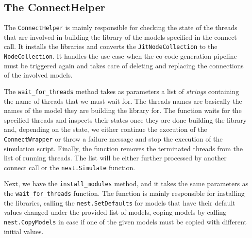 \subsection{The ConnectHelper}


The \texttt{ConnectHelper} is mainly responsible for checking the state of the threads that are involved in building the library of the models specified in the connect call. It installs the libraries and converts the \texttt{JitNodeCollection} to the \texttt{NodeCollection}. It handles the use case when the co-code generation pipeline must be triggered again and takes care of deleting and replacing the connections of the involved models.


The \texttt{wait\_for\_threads} method takes as parameters a list of \emph{strings} containing the name of threads that we must wait for. The threads names are basically the names of the model they are building the library for. The function waits for the specified threads and inspects their states once they are done building the library and, depending on the state, we either continue the execution of the \texttt{ConnectWrapper} or throw a failure message and stop the execution of the simulation script. Finally, the function removes the terminated threads from the list of running threads. The list will be either further processed by another connect call or the \texttt{nest.Simulate} function.

Next, we have the \texttt{install\_modules} method, and it takes the same parameters as the  \texttt{wait\_for\_threads} function. The function is mainly responsible for installing the libraries, calling the \texttt{nest.SetDefaults} for models that have their default values changed under the provided list of models, coping models by calling \texttt{nest.CopyModels} in case if one of the given models must be copied with different initial values.

